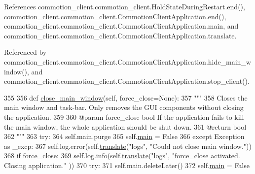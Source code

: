 References commotion\+\_\+client.\+commotion\+\_\+client.\+Hold\+State\+During\+Restart.\+end(), commotion\+\_\+client.\+commotion\+\_\+client.\+Commotion\+Client\+Application.\+end(), commotion\+\_\+client.\+commotion\+\_\+client.\+Commotion\+Client\+Application.\+main, and commotion\+\_\+client.\+commotion\+\_\+client.\+Commotion\+Client\+Application.\+translate.



Referenced by commotion\+\_\+client.\+commotion\+\_\+client.\+Commotion\+Client\+Application.\+hide\+\_\+main\+\_\+window(), and commotion\+\_\+client.\+commotion\+\_\+client.\+Commotion\+Client\+Application.\+stop\+\_\+client().


\begin{DoxyCode}
355 
356     \textcolor{keyword}{def }\hyperlink{classcommotion__client_1_1commotion__client_1_1CommotionClientApplication_ac3f5efd893879314eb1fbcf7e4d90192}{close\_main\_window}(self, force\_close=None):
357         \textcolor{stringliteral}{"""}
358 \textcolor{stringliteral}{        Closes the main window and task-bar. Only removes the GUI components without closing the
       application.}
359 \textcolor{stringliteral}{}
360 \textcolor{stringliteral}{        @param force\_close bool If the application fails to kill the main window, the whole application
       should be shut down.}
361 \textcolor{stringliteral}{        @return bool}
362 \textcolor{stringliteral}{        """}
363         \textcolor{keywordflow}{try}:
364             self.main.purge
365             self.\hyperlink{classcommotion__client_1_1commotion__client_1_1CommotionClientApplication_a4ae692cf60dc0a935cf2e8a72f657d1a}{main} = \textcolor{keyword}{False}
366         \textcolor{keywordflow}{except} Exception \textcolor{keyword}{as} \_excp:
367             self.log.error(self.\hyperlink{classcommotion__client_1_1commotion__client_1_1CommotionClientApplication_a57e951c9b241fb0e0c70055b4ca1b6f7}{translate}(\textcolor{stringliteral}{"logs"}, \textcolor{stringliteral}{"Could not close main window."}))
368             \textcolor{keywordflow}{if} force\_close:
369                 self.log.info(self.\hyperlink{classcommotion__client_1_1commotion__client_1_1CommotionClientApplication_a57e951c9b241fb0e0c70055b4ca1b6f7}{translate}(\textcolor{stringliteral}{"logs"}, \textcolor{stringliteral}{"force\_close activated. Closing application."}
      ))
370                 \textcolor{keywordflow}{try}:
371                     self.main.deleteLater()
372                     self.\hyperlink{classcommotion__client_1_1commotion__client_1_1CommotionClientApplication_a4ae692cf60dc0a935cf2e8a72f657d1a}{main} = \textcolor{keyword}{False}

\end{DoxyCode}
